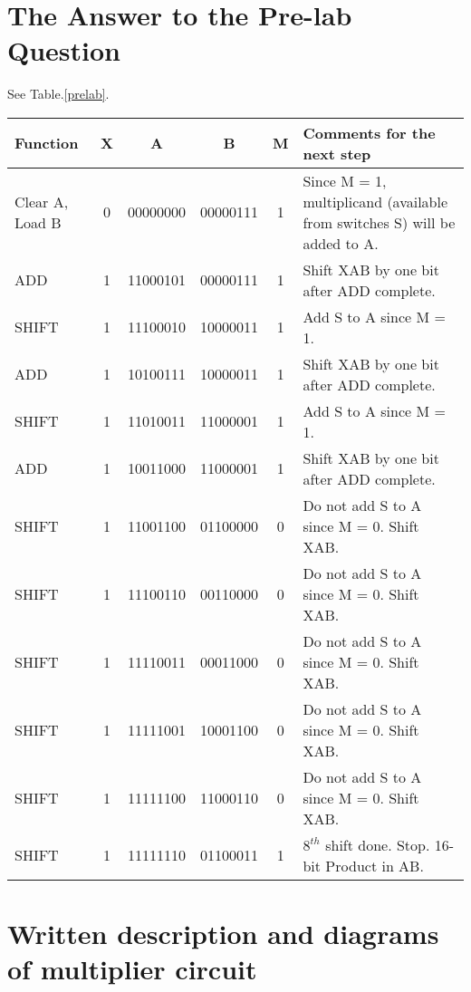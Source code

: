 \documentclass[11pt]{article}
\begin{document}
\section{The Answer to the Pre-lab Question}
See Table.\ref{prelab}.
\begin{table*}[h]
    \centering
    \begin{tabularx}{\textwidth}{|l|c|c|c|c|X|}
        \hline
        \textbf{Function} & \textbf{X} & \textbf{A} & \textbf{B} & \textbf{M} & \textbf{Comments for the next step} \\ \hline
        Clear A, Load B & 0 & 00000000 & 00000111 & 1 & Since M = 1, multiplicand (available
        from switches S) will be added to
        A.
        \\ \hline
        ADD & 1 & 11000101 & 00000111 & 1 & Shift XAB by one bit after ADD complete.\\ \hline
        SHIFT & 1 & 11100010 & 10000011 & 1 & Add S to A since M = 1.\\ \hline
        ADD & 1 & 10100111 & 10000011 & 1 & Shift XAB by one bit after ADD complete.\\ \hline
        SHIFT & 1 & 11010011 & 11000001 & 1 & Add S to A since M = 1.\\ \hline
        ADD & 1 & 10011000 & 11000001 & 1 & Shift XAB by one bit after ADD complete.\\ \hline
        SHIFT & 1 & 11001100 & 01100000 & 0 & Do not add S to A since M = 0. Shift XAB.\\ \hline
        SHIFT & 1 & 11100110 & 00110000 & 0 & Do not add S to A since M = 0. Shift XAB.\\ \hline
        SHIFT & 1 & 11110011 & 00011000 & 0 & Do not add S to A since M = 0. Shift XAB.\\ \hline
        SHIFT & 1 & 11111001 & 10001100 & 0 & Do not add S to A since M = 0. Shift XAB.\\ \hline
        SHIFT & 1 & 11111100 & 11000110 & 0 & Do not add S to A since M = 0. Shift XAB.\\ \hline
        SHIFT & 1 & 11111110 & 01100011 & 1 & $8^{th}$ shift done. Stop. 16-bit Product in AB.\\ \hline

    \end{tabularx}
    \caption{The answer to the pre-lab question}
    \label{prelab}
\end{table*}

\section{Written description and diagrams of multiplier circuit}
\end{document}
